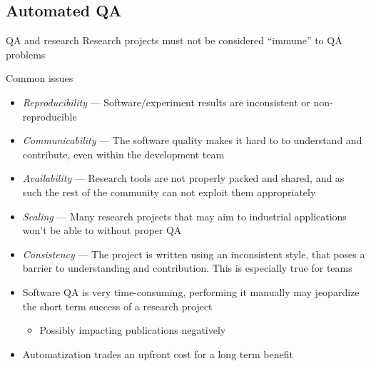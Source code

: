 \documentclass[presentation]{beamer}
\begin{document}
\subsection{Automated QA}

\begin{frame}[fragile]{QA and research}
    Research projects must not be considered ``immune'' to QA problems
    \begin{block}{Common issues}
    \footnotesize
        \begin{itemize}
            \item \textit{Reproducibility} --- Software/experiment results are inconsistent or non-reproducible
            \item \textit{Communicability} --- The software quality makes it hard to to understand and contribute, even within the development team
            \item \textit{Availability} --- Research tools are not properly packed and shared, and as such the rest of the community can not exploit them appropriately
            \item \textit{Scaling} --- Many research projects that may aim to industrial applications won't be able to without proper QA
            \item \textit{Consistency} --- The project is written using an inconsistent style, that poses a barrier to understanding and contribution. This is especially true for teams
        \end{itemize}
    \end{block}
    \begin{itemize}
        \item Software QA is very time-consuming, performing it manually may jeopardize the short term success of a research project
        \begin{itemize}
            \item Possibly impacting publications negatively
        \end{itemize}
        \item Automatization trades an upfront cost for a long term benefit
    \end{itemize}
\end{frame}
\end{document}
